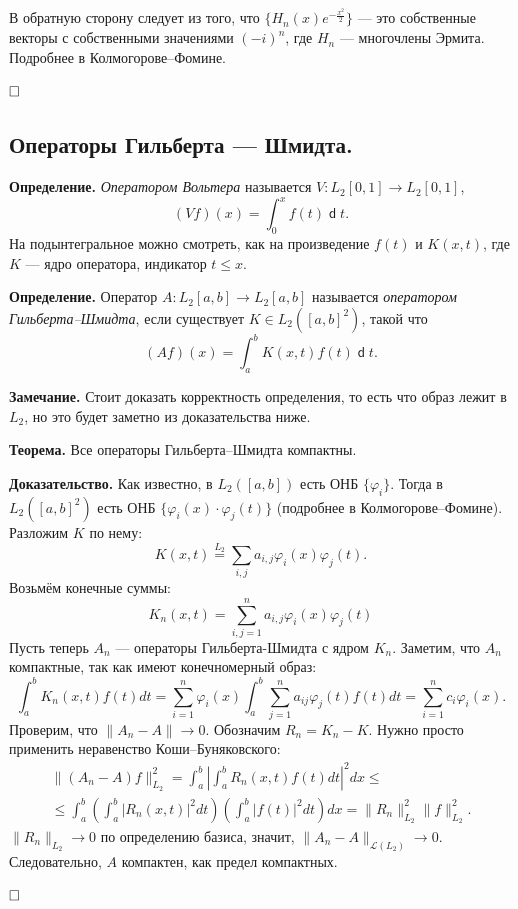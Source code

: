 \documentclass[12pt, a4paper]{article}
\DeclareMathOperator{\dif}{\mathsf{d}}
\newcommand{\QED}{$\hfill\square$}
\renewcommand{\le}{\leqslant}  %
\renewcommand{\phi}{\varphi}   %
\begin{document}
В обратную сторону следует из того, что $\{H_n(x) e^{-\frac{x^2}{2}}\}$ --- это собственные векторы с собственными значениями $(-i)^n$, где $H_n$ --- многочлены Эрмита.
Подробнее в Колмогорове--Фомине.

\QED



\subsection{Операторы Гильберта --- Шмидта.}

\textbf{Определение.} \textit{Оператором Вольтера} называется $V: L_2[0, 1] \to L_2[0, 1]$, 
\[
    (Vf)(x) = \int_0^x f(t) \dif t.
\]
На подынтегральное можно смотреть, как на произведение $f(t)$ и $K(x, t)$, где $K$ --- ядро оператора, индикатор $t \le x$.

\textbf{Определение.} Оператор $A: L_2[a, b] \to L_2[a, b]$ называется \textit{оператором Гильберта--Шмидта}, если существует $K \in L_2([a, b]^2)$, такой что
\[
    (Af)(x) = \int_a^b K(x, t) f(t) \dif t.
\]

\textbf{Замечание.} Стоит доказать корректность определения, то есть что образ лежит в $L_2$, но это будет заметно из доказательства ниже.

\textbf{Теорема.} Все операторы Гильберта--Шмидта компактны.

\textbf{Доказательство.} Как известно, в $L_2([a, b])$ есть ОНБ $\{\phi_i\}$. Тогда в $L_2([a, b]^2)$ есть ОНБ $\{\phi_i(x) \cdot \phi_j(t)\}$ (подробнее в Колмогорове--Фомине).
Разложим $K$ по нему: 
\[
    K(x, t) \overset{L_2}{=} \sum_{i,j} a_{i,j} \phi_i(x) \phi_j(t).
\]
Возьмём конечные суммы:
\[
    K_n(x, t) = \sum_{i,j=1}^n a_{i,j} \phi_i(x) \phi_j(t)
\]
Пусть теперь $A_n$ --- операторы Гильберта-Шмидта с ядром $K_n$. Заметим, что $A_n$ компактные, так как имеют конечномерный образ:
\[
    \int_a^b K_n(x, t) f(t) dt = \sum_{i=1}^n \phi_i(x) \int_a^b \sum_{j=1}^n a_{ij} \phi_j(t) f(t) dt = \sum_{i=1}^n c_i \phi_i(x).
\]
Проверим, что $\|A_n - A\| \to 0$. Обозначим $R_n = K_n - K$.  Нужно просто применить неравенство Коши–Буняковского:
\begin{multline*}
    \|(A_n - A)f\|_{L_2}^2 = \int_{a}^{b} \left|\int_a^b R_n(x, t) f(t) dt \right|^2 dx \le \\ \le \int_{a}^{b} \left(\int_a^b |R_n(x, t)|^2 dt\right) \left(\int_a^b |f(t)|^2 dt\right) dx = \|R_n\|_{L_2}^2 \|f\|_{L_2}^2.
\end{multline*}
$\|R_n\|_{L_2} \to 0$ по определению базиса, значит, $\|A_n - A\|_{\mathcal L(L_2)} \to 0$. Следовательно, $A$ компактен, как предел компактных.

\QED
\end{document}
